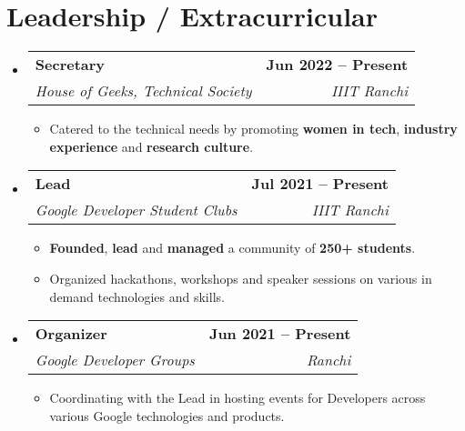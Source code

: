 \documentclass[letterpaper,11pt]{article}
\makeatletter
\newcommand{\resumeItem}[1]{
  \item\small{
    {#1 \vspace{-2pt}}
  }
}
\newcommand{\resumeSubheading}[4]{
  \vspace{-2pt}\item
    \begin{tabular*}{1.0\textwidth}[t]{l@{\extracolsep{\fill}}r}
      \textbf{#1} & \textbf{\small #2} \\
      \textit{\small#3} & \textit{\small #4} \\
    \end{tabular*}\vspace{-7pt}
}
\newcommand{\resumeSubHeadingListStart}{\begin{itemize}[leftmargin=0.0in, label={}]}
\newcommand{\resumeSubHeadingListEnd}{\end{itemize}}
\newcommand{\resumeItemListStart}{\begin{itemize}}
\newcommand{\resumeItemListEnd}{\end{itemize}\vspace{-5pt}}
\makeatother
\begin{document}
\section{Leadership / Extracurricular}

    \resumeSubHeadingListStart
        \resumeSubheading{Secretary}{Jun 2022 -- Present}{House of Geeks, Technical Society}{IIIT Ranchi}
            \resumeItemListStart
                \resumeItem{Catered to the technical needs by promoting \textbf{women in tech}, \textbf{industry experience} and \textbf{research culture}.}
            \resumeItemListEnd
            
        \resumeSubheading{Lead}{Jul 2021 -- Present}{Google Developer Student Clubs}{IIIT Ranchi}
            \resumeItemListStart
                \resumeItem{\textbf{Founded}, \textbf{lead} and \textbf{managed} a community of \textbf{250+ students}.}
                \resumeItem{Organized hackathons, workshops and speaker sessions on various in demand technologies and skills.}
            \resumeItemListEnd

        \resumeSubheading{Organizer}{Jun 2021 -- Present}{Google Developer Groups}{Ranchi}
            \resumeItemListStart
                \resumeItem{Coordinating with the Lead in hosting events for Developers across various Google technologies and products.}
            \resumeItemListEnd

    \resumeSubHeadingListEnd
\end{document}
